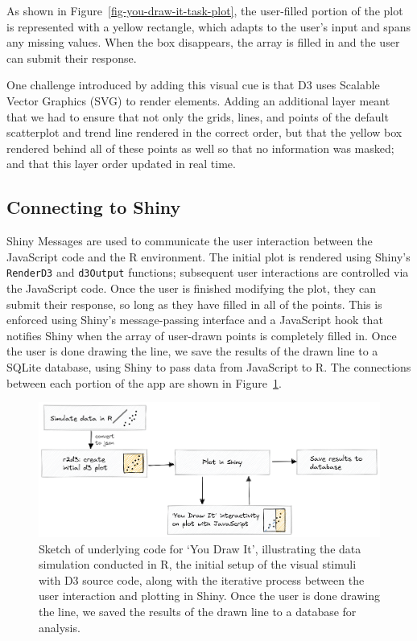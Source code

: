 \documentclass[
]{jds}
\begin{document}
As shown in Figure~\ref{fig-you-draw-it-task-plot}, the user-filled
portion of the plot is represented with a yellow rectangle, which adapts
to the user's input and spans any missing values. When the box
disappears, the array is filled in and the user can submit their
response.

One challenge introduced by adding this visual cue is that D3 uses
Scalable Vector Graphics (SVG) to render elements. Adding an additional
layer meant that we had to ensure that not only the grids, lines, and
points of the default scatterplot and trend line rendered in the correct
order, but that the yellow box rendered behind all of these points as
well so that no information was masked; and that this layer order
updated in real time.

\hypertarget{connecting-to-shiny}{%
\subsection{Connecting to Shiny}\label{connecting-to-shiny}}

Shiny Messages are used to communicate the user interaction between the
JavaScript code and the R environment. The initial plot is rendered
using Shiny's \texttt{RenderD3} and \texttt{d3Output} functions;
subsequent user interactions are controlled via the JavaScript code.
Once the user is finished modifying the plot, they can submit their
response, so long as they have filled in all of the points. This is
enforced using Shiny's message-passing interface and a JavaScript hook
that notifies Shiny when the array of user-drawn points is completely
filled in. Once the user is done drawing the line, we save the results
of the drawn line to a SQLite database, using Shiny to pass data from
JavaScript to R. The connections between each portion of the app are
shown in Figure~\ref{fig-you-draw-it-code-sketch}.

\begin{figure}

{\centering \includegraphics{images/code-sketch.png}

}

\caption{\label{fig-you-draw-it-code-sketch}Sketch of underlying code
for `You Draw It', illustrating the data simulation conducted in R, the
initial setup of the visual stimuli with D3 source code, along with the
iterative process between the user interaction and plotting in Shiny.
Once the user is done drawing the line, we saved the results of the
drawn line to a database for analysis.}

\end{figure}
\end{document}
